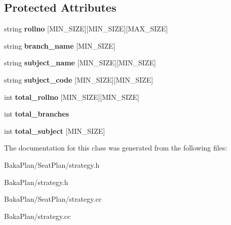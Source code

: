 \subsection*{Protected Attributes}
\begin{DoxyCompactItemize}
\item 
\hypertarget{classStrategy_a4b6305b8d54a2221f880d2e7bab495e1}{string {\bfseries rollno} \mbox{[}M\-I\-N\-\_\-\-S\-I\-Z\-E\mbox{]}\mbox{[}M\-I\-N\-\_\-\-S\-I\-Z\-E\mbox{]}\mbox{[}M\-A\-X\-\_\-\-S\-I\-Z\-E\mbox{]}}\label{classStrategy_a4b6305b8d54a2221f880d2e7bab495e1}

\item 
\hypertarget{classStrategy_a0b6fc37cf32cc73336f6560c7edb6e0c}{string {\bfseries branch\-\_\-name} \mbox{[}M\-I\-N\-\_\-\-S\-I\-Z\-E\mbox{]}}\label{classStrategy_a0b6fc37cf32cc73336f6560c7edb6e0c}

\item 
\hypertarget{classStrategy_ab7afc1d54ea614a242a3f46ed996ead1}{string {\bfseries subject\-\_\-name} \mbox{[}M\-I\-N\-\_\-\-S\-I\-Z\-E\mbox{]}\mbox{[}M\-I\-N\-\_\-\-S\-I\-Z\-E\mbox{]}}\label{classStrategy_ab7afc1d54ea614a242a3f46ed996ead1}

\item 
\hypertarget{classStrategy_ae83fbca3ce4074e6ce9635370cdadafa}{string {\bfseries subject\-\_\-code} \mbox{[}M\-I\-N\-\_\-\-S\-I\-Z\-E\mbox{]}\mbox{[}M\-I\-N\-\_\-\-S\-I\-Z\-E\mbox{]}}\label{classStrategy_ae83fbca3ce4074e6ce9635370cdadafa}

\item 
\hypertarget{classStrategy_ad3f61d0dbda67dc3edb9787c2faaeaed}{int {\bfseries total\-\_\-rollno} \mbox{[}M\-I\-N\-\_\-\-S\-I\-Z\-E\mbox{]}\mbox{[}M\-I\-N\-\_\-\-S\-I\-Z\-E\mbox{]}}\label{classStrategy_ad3f61d0dbda67dc3edb9787c2faaeaed}

\item 
\hypertarget{classStrategy_a256aac5a8349dd1bafdb6c14d3e9543f}{int {\bfseries total\-\_\-branches}}\label{classStrategy_a256aac5a8349dd1bafdb6c14d3e9543f}

\item 
\hypertarget{classStrategy_ab4c32858e3c2bb708a299643e128632a}{int {\bfseries total\-\_\-subject} \mbox{[}M\-I\-N\-\_\-\-S\-I\-Z\-E\mbox{]}}\label{classStrategy_ab4c32858e3c2bb708a299643e128632a}

\end{DoxyCompactItemize}


The documentation for this class was generated from the following files\-:\begin{DoxyCompactItemize}
\item 
Baka\-Plan/\-Seat\-Plan/strategy.\-h\item 
Baka\-Plan/strategy.\-h\item 
Baka\-Plan/\-Seat\-Plan/strategy.\-cc\item 
Baka\-Plan/strategy.\-cc\end{DoxyCompactItemize}
